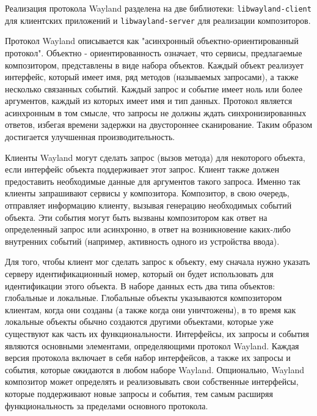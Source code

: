Реализация протокола Wayland разделена на две библиотеки: \texttt{libwayland-client} для клиентских приложений и \texttt{libwayland-server} для реализации композиторов.

Протокол Wayland описывается как "асинхронный объектно-ориентированный протокол". Объектно - ориентированность означает, что сервисы, предлагаемые композитором, представлены в виде набора объектов. Каждый объект реализует интерфейс, который имеет имя, ряд методов (называемых запросами), а также несколько связанных событий. Каждый запрос и событие имеет ноль или более аргументов, каждый из которых имеет имя и тип данных. Протокол является асинхронным в том смысле, что запросы не должны ждать синхронизированных ответов, избегая времени задержки на двустороннее сканирование. Таким образом достигается улучшенная производительность. 

Клиенты Wayland могут сделать запрос (вызов метода) для некоторого объекта, если интерфейс объекта поддерживает этот запрос. Клиент также должен предоставить необходимые данные для аргументов такого запроса. Именно так клиенты запрашивают сервисы у композитора. Композитор, в свою очередь, отправляет информацию клиенту, вызывая генерацию необходимых событий объекта. Эти события могут быть вызваны композитором как ответ на определенный запрос или асинхронно, в ответ на возникновение каких-либо внутренних событий (например, активность одного из устройства ввода). 

Для того, чтобы клиент мог сделать запрос к объекту, ему сначала нужно указать серверу идентификационный номер, который он будет использовать для идентификации этого объекта. В наборе данных есть два типа объектов: глобальные и локальные. Глобальные объекты указываются композитором клиентам, когда они созданы (а также когда они уничтожены), в то время как локальные объекты обычно создаются другими объектами, которые уже существуют как часть их функциональности. Интерфейсы, их запросы и события являются основными элементами, определяющими протокол Wayland. Каждая версия протокола включает в себя набор интерфейсов, а также их запросы и события, которые ожидаются в любом наборе Wayland. Опционально, Wayland композитор может определять и реализовывать свои собственные интерфейсы, которые поддерживают новые запросы и события, тем самым расширяя функциональность за пределами основного протокола.


